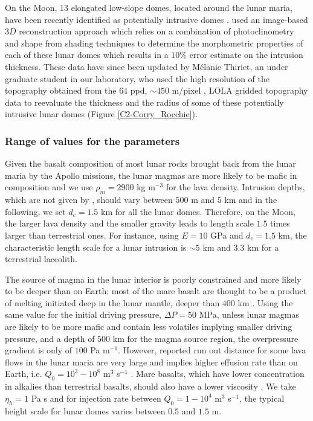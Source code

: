 On the Moon, $13$ elongated  low-slope domes, located around the lunar
maria, have  been recently  identified as potentially  intrusive domes
\citep{Wohler:2007it,Wohler:2009jj}.   \citet{Wohler:2009jj}  used  an
image-based $3D$ reconstruction approach which relies on a combination
of photoclinometry and shape from  shading techniques to determine the
morphometric properties of each of  these lunar domes which results in
a $10\%$  error estimate on  the intrusion thickness. These  data have
since been  updated by Mélanie  Thiriet, an under graduate  student in
our  laboratory,  who  used  the high  resolution  of  the  topography
obtained from  the $64$ ppd, $\sim  450$ m/pixel \citep{Zuber:2009bq},
LOLA  gridded topography  data  to reevaluate  the  thickness and  the
radius  of some  of these  potentially intrusive  lunar domes  (Figure
\ref{C2-Corry_Rocchie}).

\subsubsection*{Range of values for the parameters}

Given the basalt composition of most lunar rocks brought back from the
lunar maria by  the Apollo missions, the lunar magmas  are more likely
to be mafic in composition and we  use $\rho_m = 2900$ kg m$^{-3}$ for
the  lava  density.    Intrusion  depths,  which  are   not  given  by
\citet{Wohler:2009jj}, should vary  between $500$ m and $5$  km and in
the following, we set $d_c=1.5$ km for all the lunar domes. Therefore,
on the Moon, the larger lava  density and the smaller gravity leads to
length scale $1.5$ times larger  than terrestrial ones.  For instance,
using $E=10$ GPa  and $d_c = 1.5$ km, the  characteristic length scale
for a lunar  intrusion is $\sim 5$  km and $3.3$ km  for a terrestrial
laccolith.

The source  of magma in the  lunar interior is poorly  constrained and
more likely to  be deeper than on  Earth; most of the  mare basalt are
thought to be a product of melting initiated deep in the lunar mantle,
deeper than $400$ km \citep{Shearer:2006gg}.  Using the same value for
the initial driving pressure, $\Delta P = 50$ MPa, unless lunar magmas
are  likely to  be  more  mafic and  contain  less volatiles  implying
smaller driving pressure, and a depth of $500$ km for the magma source
region,  the  overpressure gradient  is  only  of $100$  Pa  m$^{-1}$.
However, reported  run out distance for  some lava flows in  the lunar
maria are very  large and implies higher effusion rate  than on Earth,
i.e.             $Q_0=10^3-10^8$             m$^3$            s$^{-1}$
\citep{Crisp:1990gf,Zimbelman:1998ww}.  Mare basalts, which have lower
concentration in alkalies than terrestrial basalts, should also have a
lower viscosity \citep{Zimbelman:1998ww}.  We take $\eta_h=1$ Pa s and
for injection rate between  $Q_0=1-10^4$ m$^{3}$ s$^{-1}$, the typical
height scale for lunar domes varies between $0.5$ and $1.5$ m.

